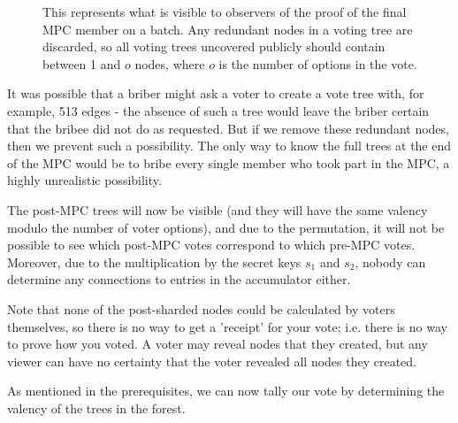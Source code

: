 \documentclass{article}
\begin{document}
\begin{figure}[h!]
        \centering
        
        \caption{This represents what is visible to observers of the proof of the final MPC member on a batch. Any redundant nodes in a voting tree are discarded, so all voting trees uncovered publicly should contain between 1 and $o$ nodes, where $o$ is the number of options in the vote.}
        \label{fig:figure6}
\end{figure}

It was possible that a briber might ask a voter to create a vote tree with, for example, 513 edges - the absence of such a tree would leave the briber certain that the bribee did not do as requested. But if we remove these redundant nodes, then we prevent such a possibility. The only way to know the full trees at the end of the MPC would be to bribe every single member who took part in the MPC, a highly unrealistic possibility.

The post-MPC trees will now be visible (and they will have the same valency modulo the number of voter options), and due to the permutation, it will not be possible to see which post-MPC votes correspond to which pre-MPC votes. Moreover, due to the multiplication by the secret keys $s_1$ and $s_2$, nobody can determine any connections to entries in the accumulator either.

Note that none of the post-sharded nodes could be calculated by voters themselves, so there is no way to get a 'receipt' for your vote; i.e. there is no way to prove how you voted. A voter may reveal nodes that they created, but any viewer can have no certainty that the voter revealed all nodes they created.

As mentioned in the prerequisites, we can now tally our vote by determining the valency of the trees in the forest.
\end{document}
